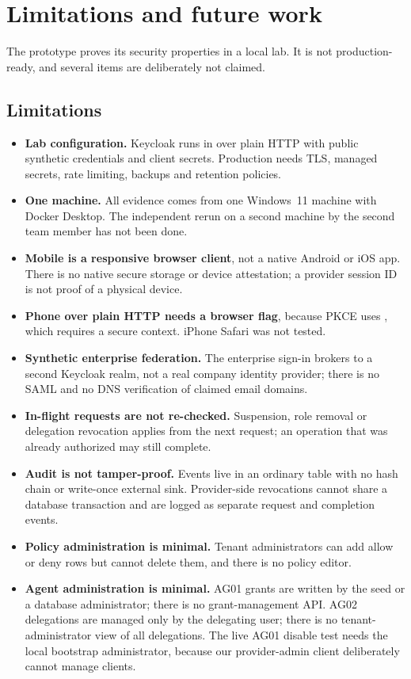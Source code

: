 \section{Limitations and future work}
\label{sec:limitations}

The prototype proves its security properties in a local lab. It is not production-ready, and several items are deliberately not claimed.

\subsection{Limitations}
\begin{itemize}
  \item \textbf{Lab configuration.} Keycloak runs in  over plain HTTP with public synthetic credentials and client secrets. Production needs TLS, managed secrets, rate limiting, backups and retention policies.
  \item \textbf{One machine.} All evidence comes from one Windows~11 machine with Docker Desktop. The independent rerun on a second machine by the second team member has not been done.
  \item \textbf{Mobile is a responsive browser client}, not a native Android or iOS app. There is no native secure storage or device attestation; a provider session ID is not proof of a physical device.
  \item \textbf{Phone over plain HTTP needs a browser flag}, because PKCE uses , which requires a secure context. iPhone Safari was not tested.
  \item \textbf{Synthetic enterprise federation.} The enterprise sign-in brokers to a second Keycloak realm, not a real company identity provider; there is no SAML and no DNS verification of claimed email domains.
  \item \textbf{In-flight requests are not re-checked.} Suspension, role removal or delegation revocation applies from the next request; an operation that was already authorized may still complete.
  \item \textbf{Audit is not tamper-proof.} Events live in an ordinary table with no hash chain or write-once external sink. Provider-side revocations cannot share a database transaction and are logged as separate request and completion events.
  \item \textbf{Policy administration is minimal.} Tenant administrators can add allow or deny rows but cannot delete them, and there is no policy editor.
  \item \textbf{Agent administration is minimal.} AG01 grants are written by the seed or a database administrator; there is no grant-management API. AG02 delegations are managed only by the delegating user; there is no tenant-administrator view of all delegations. The live AG01 disable test needs the local bootstrap administrator, because our provider-admin client deliberately cannot manage clients.

\end{itemize}
